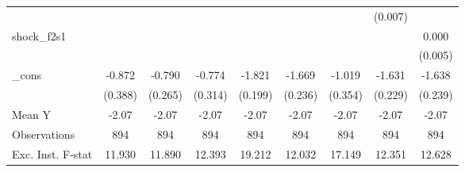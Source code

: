 {\begin{tabular}{l*{8}{c}}
            &                     &                     &                     &                     &                     &                     &     (0.007)         &                     \\
\addlinespace
shock\_f2s1  &                     &                     &                     &                     &                     &                     &                     &       0.000         \\
            &                     &                     &                     &                     &                     &                     &                     &     (0.005)         \\
\addlinespace
\_cons      &      -0.872\sym{**} &      -0.790\sym{***}&      -0.774\sym{**} &      -1.821\sym{***}&      -1.669\sym{***}&      -1.019\sym{***}&      -1.631\sym{***}&      -1.638\sym{***}\\
            &     (0.388)         &     (0.265)         &     (0.314)         &     (0.199)         &     (0.236)         &     (0.354)         &     (0.229)         &     (0.239)         \\
\midrule
Mean Y      &       -2.07         &       -2.07         &       -2.07         &       -2.07         &       -2.07         &       -2.07         &       -2.07         &       -2.07         \\
Observations&         894         &         894         &         894         &         894         &         894         &         894         &         894         &         894         \\
Exc. Inst. F-stat&      11.930         &      11.890         &      12.393         &      19.212         &      12.032         &      17.149         &      12.351         &      12.628         \\
\bottomrule
\end{tabular}
}
